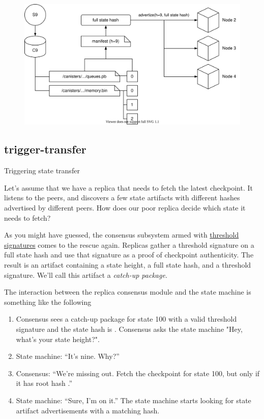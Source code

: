 \documentclass{article}
\begin{document}
\begin{figure}[grayscale-diagram]
\includegraphics{images/02-checkpoint-artifact.svg}
\end{figure}

\subsection{trigger-transfer}{Triggering state transfer}

Let's assume that we have a replica that needs to fetch the latest checkpoint.
It listens to the peers, and discovers a few state artifacts with different hashes advertised by different peers.
How does our poor replica decide which state it needs to fetch?

As you might have guessed, the consensus subsystem armed with \href{https://en.wikipedia.org/wiki/Threshold_cryptosystem}{threshold signatures} comes to the rescue again.
Replicas gather a threshold signature on a full state hash and use that signature as a proof of checkpoint authenticity.
The result is an artifact containing a state height, a full state hash, and a threshold signature.
We'll call this artifact a \em{catch-up package}.

The interaction between the replica consensus module and the state machine is something like the following
\begin{enumerate}
\item 
  Consensus sees a catch-up package for state 100 with a valid threshold signature and the state hash is .
  Consensus asks the state machine "Hey, what's your state height?".
\item State machine: ``It's nine. Why?''
\item Consensus: ``We're missing out. Fetch the checkpoint for state 100, but only if it has root hash .''
\item State machine: ``Sure, I'm on it.'' The state machine starts looking for state artifact advertisements with a matching hash.
\end{enumerate}
\end{document}
